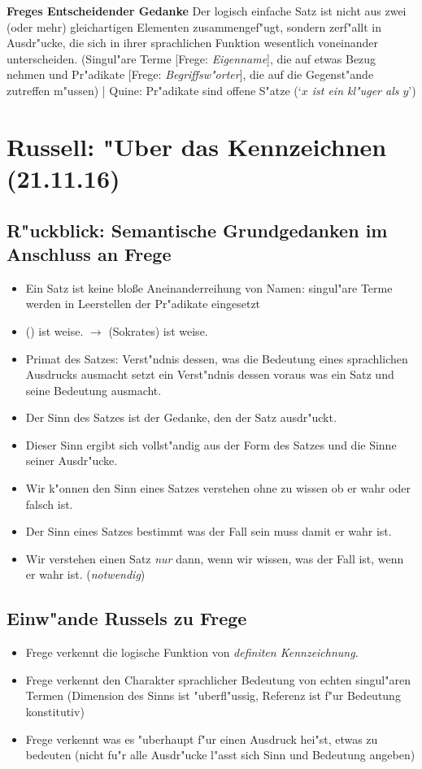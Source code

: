 \documentclass[emulatestandardclasses]{scrartcl}
\begin{document}
\textbf{Freges Entscheidender Gedanke} Der logisch einfache Satz ist nicht aus zwei (oder mehr) gleichartigen Elementen zusammengef"ugt, sondern zerf"allt in Ausdr"ucke, die sich in ihrer sprachlichen Funktion wesentlich voneinander unterscheiden. (Singul"are Terme [Frege: \emph{Eigenname}], die auf etwas Bezug nehmen und Pr"adikate [Frege: \emph{Begriffsw"orter}], die auf die Gegenst"ande zutreffen m"ussen) | Quine: Pr"adikate sind offene S"atze (`\emph{$x$ ist ein kl"uger als $y$}')

\section{Russell: "Uber das Kennzeichnen\\(21.11.16)}

\subsection{R"uckblick: Semantische Grundgedanken im Anschluss an Frege}

\begin{itemize}
  \item Ein Satz ist keine blo\ss e Aneinanderreihung von Namen: singul"are Terme werden in Leerstellen der Pr"adikate eingesetzt
  \item () ist weise. $\rightarrow$ (Sokrates) ist weise.
  \item Primat des Satzes: Verst"ndnis dessen, was die Bedeutung eines sprachlichen Ausdrucks ausmacht setzt ein Verst"ndnis dessen voraus was ein Satz und seine Bedeutung ausmacht.
  \item Der Sinn des Satzes ist der Gedanke, den der Satz ausdr"uckt.
  \item Dieser Sinn ergibt sich vollst"andig aus der Form des Satzes und die Sinne seiner Ausdr"ucke.
  \item Wir k"onnen den Sinn eines Satzes verstehen ohne zu wissen ob er wahr oder falsch ist.
  \item Der Sinn eines Satzes bestimmt was der Fall sein muss damit er wahr ist.
  \item Wir verstehen einen Satz \emph{nur} dann, wenn wir wissen, was der Fall ist, wenn er wahr ist. (\emph{notwendig})
\end{itemize}

\subsection{Einw"ande Russels zu Frege}
\begin{itemize}
  \item Frege verkennt die logische Funktion von \emph{definiten Kennzeichnung}.
  \item Frege verkennt den Charakter sprachlicher Bedeutung von echten singul"aren Termen (Dimension des Sinns ist "uberfl"ussig, Referenz ist f"ur Bedeutung konstitutiv)
  \item Frege verkennt was es "uberhaupt f"ur einen Ausdruck hei"st, etwas zu bedeuten (nicht fu"r alle Ausdr"ucke l"asst sich Sinn und Bedeutung angeben)
\end{itemize}
\end{document}
